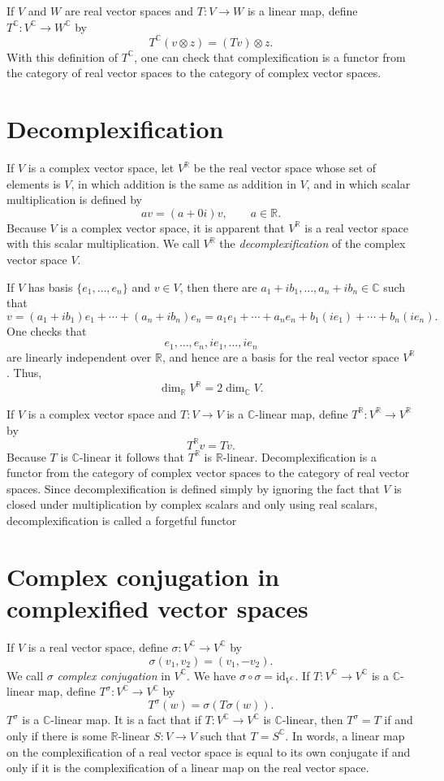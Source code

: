 \documentclass{article}
\newcommand{\id}{\textrm{id}}
\begin{document}
If $V$ and $W$ are real vector spaces and $T:V \to W$ is a linear map, define $T^\mathbb{C}:V^\mathbb{C} \to W^\mathbb{C}$ by
\[
T^\mathbb{C}(v \otimes z)=(Tv) \otimes z.
\]
With this definition of $T^\mathbb{C}$, one can check that complexification is a functor from the category of real vector
spaces to the category of complex vector spaces.


\section{Decomplexification}
If $V$ is a complex vector space, let $V^\mathbb{R}$ be the real vector space whose set of elements is $V$, in which addition is the same as addition
in $V$, and in which scalar multiplication is defined by
\[
av=(a+0i)v, \qquad a \in \mathbb{R}.
\]
Because $V$ is a complex vector space, it is apparent that $V^\mathbb{R}$ is  a real vector space with this scalar multiplication.
We call $V^\mathbb{R}$ the {\em decomplexification} of the complex vector space $V$.

If $V$ has basis $\{e_1,\ldots,e_n\}$ and $v \in V$,
then there are $a_1+ib_1,\ldots,a_n+ib_n \in \mathbb{C}$ such that
\[
v=(a_1+ib_1)e_1+\cdots+(a_n+ib_n)e_n=a_1e_1+\cdots+a_ne_n+b_1(ie_1)+\cdots+
b_n(ie_n).
\]
One checks that 
\[
e_1,\ldots,e_n,ie_1,\ldots,ie_n
\]
are linearly independent over $\mathbb{R}$, and hence are a basis for the real vector space $V^\mathbb{R}$. Thus, 
\[
\dim_\mathbb{R} V^\mathbb{R} = 2\dim_\mathbb{C} V.
\]

If $V$ is a complex vector space and $T:V \to V$ is a $\mathbb{C}$-linear map, define $T^\mathbb{R}:V^\mathbb{R} \to V^\mathbb{R}$ by
\[
T^\mathbb{R}v=Tv.
\]
Because $T$ is $\mathbb{C}$-linear it follows that $T^\mathbb{R}$ is $\mathbb{R}$-linear.
Decomplexification is a functor from the category of complex vector spaces to the category of real vector spaces. Since 
decomplexification is defined simply by ignoring the fact that $V$ is closed
under multiplication by complex scalars and only using real scalars,
decomplexification is called a forgetful functor

\section{Complex conjugation in complexified vector spaces}
If $V$ is a real vector space, define $\sigma:V^\mathbb{C} \to V^\mathbb{C}$ by
\[
\sigma(v_1,v_2)=(v_1,-v_2).
\]
We call $\sigma$ {\em complex conjugation} in $V^\mathbb{C}$. We have $\sigma \circ \sigma = \id_{V^\mathbb{C}}$.
If $T:V^\mathbb{C} \to V^\mathbb{C}$ is a $\mathbb{C}$-linear map, define $T^\sigma:V^\mathbb{C} \to V^\mathbb{C}$
by
\[
T^\sigma(w)=\sigma(T \sigma (w)).
\]
$T^\sigma$ is a $\mathbb{C}$-linear map.
It is a fact that if $T:V^\mathbb{C} \to V^\mathbb{C}$ is $\mathbb{C}$-linear, then $T^\sigma=T$ if and only if there
is some $\mathbb{R}$-linear $S:V \to V$ such that $T=S^\mathbb{C}$. In words, a linear map on the complexification
of a real vector space is equal to its own conjugate if and only if it is the complexification of a linear map
on the real vector space.
\end{document}
